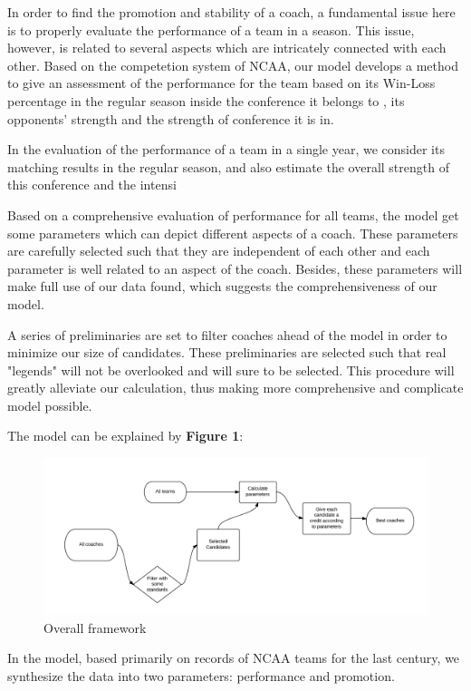 In order to find the promotion and stability of a coach, a fundamental issue here is to properly evaluate the performance of a team in a season. This issue, however, is related to several aspects which are intricately connected with each other. Based on the competetion system of NCAA, our model develops a method to give an assessment of the performance for the team based on its Win-Loss percentage in the regular season inside the conference it belongs to     , its opponents' strength and the strength of conference it is in.






In the evaluation of the performance of a team in a single year, we consider its matching results in the regular season, and also estimate the overall strength of this conference and the intensi

Based on a comprehensive evaluation of performance for all teams, the model get some parameters which can depict different aspects of a coach. These parameters are carefully selected such that they are independent of each other and each parameter is well related to an aspect of the coach. Besides, these parameters will make full use of our data found, which suggests the comprehensiveness of our model.

A series of preliminaries are set to filter coaches ahead of the model in order to minimize our size of candidates. These preliminaries are selected such that real "legends" will not be overlooked and will sure to be selected. This procedure will greatly alleviate our calculation, thus making more comprehensive and complicate model possible.

The model can be explained by \textbf{Figure 1}:
\begin{figure}[!ht]
\centering
\includegraphics[width = 150mm]{picture/OverallFrame.png}
\caption{Overall framework}
\end{figure}

In the model, based primarily on records of NCAA teams for the last century, we synthesize the data into two parameters: performance and promotion.

